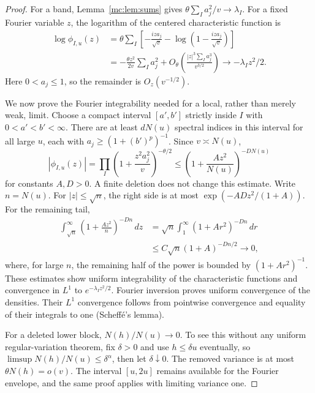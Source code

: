 \begin{proof}
For a band, Lemma~\ref{mc:lem:sums} gives
$\theta\sum_Ia_j^2/v\to\lambda_I$.  For a fixed Fourier variable $z$,
the logarithm of the centered characteristic function is
\begin{align*}
 \log\phi_{I,u}(z)
 &=\theta\sum_I\left[-\frac{iza_j}{\sqrt v}
              -\log\left(1-\frac{iza_j}{\sqrt v}\right)\right]\\
 &=-\frac{\theta z^2}{2v}\sum_Ia_j^2
     +O_\theta\left(\frac{|z|^3\sum_Ia_j^3}{v^{3/2}}\right)
 \longrightarrow-\lambda_Iz^2/2.
\end{align*}
Here $0<a_j\leq1$, so the remainder is $O_z(v^{-1/2})$.

We now prove the Fourier integrability needed for a local, rather than
merely weak, limit.  Choose a compact interval $[a',b']$ strictly inside
$I$ with $0<a'<b'<\infty$.  There are at least $dN(u)$ spectral indices
in this interval for all large $u$, each with
$a_j\geq(1+(b')^p)^{-1}$.  Since $v\asymp N(u)$,
\begin{equation}\label{mc:eq:fourier-envelope}
 |\phi_{I,u}(z)|
 =\prod_I\left(1+\frac{z^2a_j^2}{v}\right)^{-\theta/2}
 \leq\left(1+\frac{Az^2}{N(u)}\right)^{-DN(u)}
\end{equation}
for constants $A,D>0$.  A finite deletion does not change this estimate.
Write $n=N(u)$.  For $|z|\leq\sqrt n$, the right side is at most
$\exp(-ADz^2/(1+A))$.  For the remaining tail,
\begin{align*}
 \int_{\sqrt n}^\infty
     \left(1+\frac{Az^2}{n}\right)^{-Dn}\,dz
 &=\sqrt n\int_1^\infty(1+Ar^2)^{-Dn}\,dr\\
 &\leq C\sqrt n(1+A)^{-Dn/2}\longrightarrow0,
\end{align*}
where, for large $n$, the remaining half of the power is bounded by
$(1+Ar^2)^{-1}$.  These estimates show uniform integrability of the
characteristic functions and convergence in $L^1$ to
$e^{-\lambda_Iz^2/2}$.  Fourier inversion proves uniform convergence of
the densities.  Their $L^1$ convergence follows from pointwise
convergence and equality of their integrals to one (Scheff\'e's lemma).

For a deleted lower block, $N(h)/N(u)\to0$.  To see this without any
uniform regular-variation theorem, fix $\delta>0$ and use
$h\leq\delta u$ eventually, so
$\limsup N(h)/N(u)\leq\delta^\alpha$, then let $\delta\downarrow0$.
The removed variance is at most $\theta N(h)=o(v)$.  The interval
$[u,2u]$ remains available for the Fourier envelope, and the same proof
applies with limiting variance one.
\end{proof}

